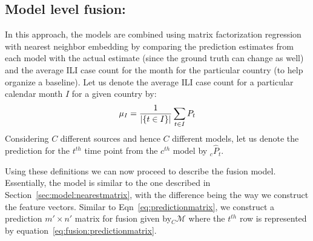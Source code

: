 \subsection{\label{sec:fusion:model} Model level fusion:}
In this approach, the models are combined using matrix factorization regression with 
nearest neighbor embedding by comparing the
prediction estimates from each model with the actual estimate (since the ground truth
can change as well) and the average
ILI case count for the month for the particular country (to help organize a baseline).
Let us denote the average ILI case count for a particular calendar 
month $I$ for a given country by:
\vspace{-1em}
\begin{equation*}
  \mu_I = {1 \over {|\lbrace t \in I\rbrace|}} \sum_{t \in I}P_{t}
\end{equation*}
\noindent
Considering $C$ different sources and hence $C$ different models, 
let us denote the prediction for the $t^{th}$ time point 
from the $c^{th}$ model by ${}_c\widehat{P}_t$.

Using these definitions we can now proceed to describe the fusion 
model. Essentially, the model is similar to the one described in 
Section~\ref{sec:model:nearestmatrix}, with the difference being 
the way we construct the feature vectors. Similar to Eqn~\ref{eq:predictionmatrix},
we construct a prediction  $m'\times n'$ matrix for fusion given by${}_C\mathcal{M}$ where 
the $t^{th}$ row is represented by equation~\ref{eq:fusion:predictionmatrix}.

